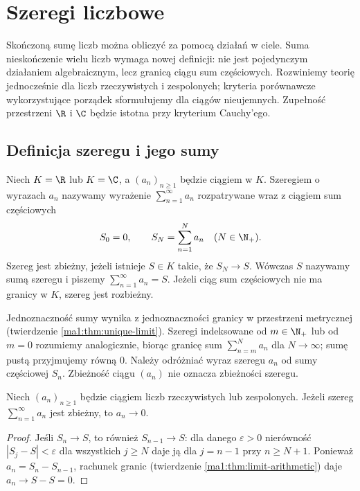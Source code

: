 \chapter{Szeregi liczbowe}
\label{ma1:ch:numerical-series}

Skończoną sumę liczb można obliczyć za pomocą działań w ciele. Suma nieskończenie wielu liczb wymaga nowej definicji: nie jest pojedynczym działaniem algebraicznym, lecz granicą ciągu sum częściowych. Rozwiniemy teorię jednocześnie dla liczb rzeczywistych i zespolonych; kryteria porównawcze wykorzystujące porządek sformułujemy dla ciągów nieujemnych. Zupełność przestrzeni $\R$ i $\C$ będzie istotna przy kryterium Cauchy'ego.

\section{Definicja szeregu i jego sumy}
\begin{definicja}
\label{ma1:def:series}
Niech $K=\R$ lub $K=\C$, a $(a_n)_{n\ge1}$ będzie ciągiem w $K$. Szeregiem o wyrazach $a_n$ nazywamy wyrażenie $\sum_{n=1}^\infty a_n$ rozpatrywane wraz z ciągiem sum częściowych
\[
 S_0=0,\qquad S_N=\sum_{n=1}^N a_n\quad(N\in\N_+).
\]
Szereg jest zbieżny, jeżeli istnieje $S\in K$ takie, że $S_N\to S$. Wówczas $S$ nazywamy sumą szeregu i piszemy $\sum_{n=1}^\infty a_n=S$. Jeżeli ciąg sum częściowych nie ma granicy w $K$, szereg jest rozbieżny.
\end{definicja}
Jednoznaczność sumy wynika z jednoznaczności granicy w przestrzeni metrycznej (twierdzenie \ref{ma1:thm:unique-limit}). Szeregi indeksowane od $m\in\N_+$ lub od $m=0$ rozumiemy analogicznie, biorąc granicę sum $\sum_{n=m}^N a_n$ dla $N\to\infty$; sumę pustą przyjmujemy równą $0$. Należy odróżniać wyraz szeregu $a_n$ od sumy częściowej $S_n$. Zbieżność ciągu $(a_n)$ nie oznacza zbieżności szeregu.

\begin{twierdzenie}
\label{ma1:thm:series-term-test}
Niech $(a_n)_{n\ge1}$ będzie ciągiem liczb rzeczywistych lub zespolonych. Jeżeli szereg $\sum_{n=1}^\infty a_n$ jest zbieżny, to $a_n\to0$.
\end{twierdzenie}
\begin{proof}
Jeśli $S_n\to S$, to również $S_{n-1}\to S$: dla danego $\varepsilon>0$ nierówność $|S_j-S|<\varepsilon$ dla wszystkich $j\ge N$ daje ją dla $j=n-1$ przy $n\ge N+1$. Ponieważ $a_n=S_n-S_{n-1}$, rachunek granic (twierdzenie \ref{ma1:thm:limit-arithmetic}) daje $a_n\to S-S=0$.
\end{proof}


